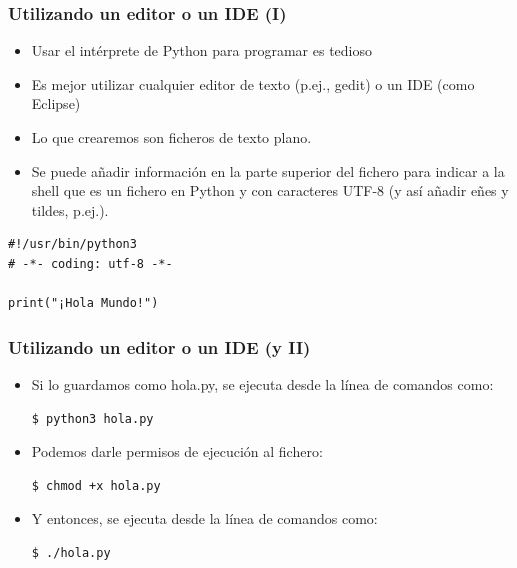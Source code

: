 \begin{frame}[fragile]
\frametitle{Utilizando un editor o un IDE (I)}

\begin{itemize}
  \item Usar el intérprete de Python para programar es tedioso
  \item Es mejor utilizar cualquier editor de texto (p.ej., gedit) o un IDE (como Eclipse)
  \item Lo que crearemos son ficheros de texto plano.
  \item Se puede añadir información en la parte superior del fichero para indicar a la shell que es un fichero en Python y con caracteres UTF-8 (y así añadir eñes y tildes, p.ej.).
\end{itemize}

\begin{footnotesize}
\begin{verbatim}
#!/usr/bin/python3
# -*- coding: utf-8 -*-

print("¡Hola Mundo!")

\end{verbatim}
\end{footnotesize}

\end{frame}


\begin{frame}[fragile]
\frametitle{Utilizando un editor o un IDE (y II)}


\begin{itemize}
  \item Si lo guardamos como hola.py, se ejecuta desde la línea de comandos como:
\begin{footnotesize}
\begin{verbatim}
$ python3 hola.py
\end{verbatim}
\end{footnotesize}

  \item Podemos darle permisos de ejecución al fichero:
\begin{footnotesize}
\begin{verbatim}
$ chmod +x hola.py
\end{verbatim}
\end{footnotesize}

  \item Y entonces, se ejecuta desde la línea de comandos como:
\begin{footnotesize}
\begin{verbatim}
$ ./hola.py
\end{verbatim}
\end{footnotesize}


  
\end{itemize}

\end{frame}



